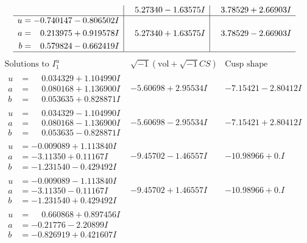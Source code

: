 \documentclass[1p]{elsarticle_modified}
\theoremstyle{definition}
\newcommand{\I}{\sqrt{-1}}
\begin{document}
$$\begin{array}{c|c|c}
 & \phantom{-}5.27340 - 1.63575 I & \phantom{-}3.78529 + 2.66903 I \\ \hline\begin{aligned}
u &= -0.740147 - 0.806502 I \\
a &= \phantom{-}0.213975 + 0.919578 I \\
b &= \phantom{-}0.579824 - 0.662419 I\end{aligned}
 & \phantom{-}5.27340 + 1.63575 I & \phantom{-}3.78529 - 2.66903 I\\
 \hline 
 \end{array}$$\newpage$$\begin{array}{c|c|c}  
\text{Solutions to }I^u_{1}& \I (\text{vol} + \sqrt{-1}CS) & \text{Cusp shape}\\
 \hline 
\begin{aligned}
u &= \phantom{-}0.034329 + 1.104990 I \\
a &= \phantom{-}0.080168 + 1.136900 I \\
b &= \phantom{-}0.053635 + 0.828871 I\end{aligned}
 & -5.60698 + 2.95534 I & -7.15421 - 2.80412 I \\ \hline\begin{aligned}
u &= \phantom{-}0.034329 - 1.104990 I \\
a &= \phantom{-}0.080168 - 1.136900 I \\
b &= \phantom{-}0.053635 - 0.828871 I\end{aligned}
 & -5.60698 - 2.95534 I & -7.15421 + 2.80412 I \\ \hline\begin{aligned}
u &= -0.009089 + 1.113840 I \\
a &= -3.11350 + 0.11167 I \\
b &= -1.231540 - 0.429492 I\end{aligned}
 & -9.45702 - 1.46557 I & -10.98966 + 0. I\phantom{ +0.000000I} \\ \hline\begin{aligned}
u &= -0.009089 - 1.113840 I \\
a &= -3.11350 - 0.11167 I \\
b &= -1.231540 + 0.429492 I\end{aligned}
 & -9.45702 + 1.46557 I & -10.98966 + 0. I\phantom{ +0.000000I} \\ \hline\begin{aligned}
u &= \phantom{-}0.660868 + 0.897456 I \\
a &= -0.21776 - 2.20899 I \\
b &= -0.826919 + 0.421607 I\end{aligned}

\end{array}$$
\end{document}
